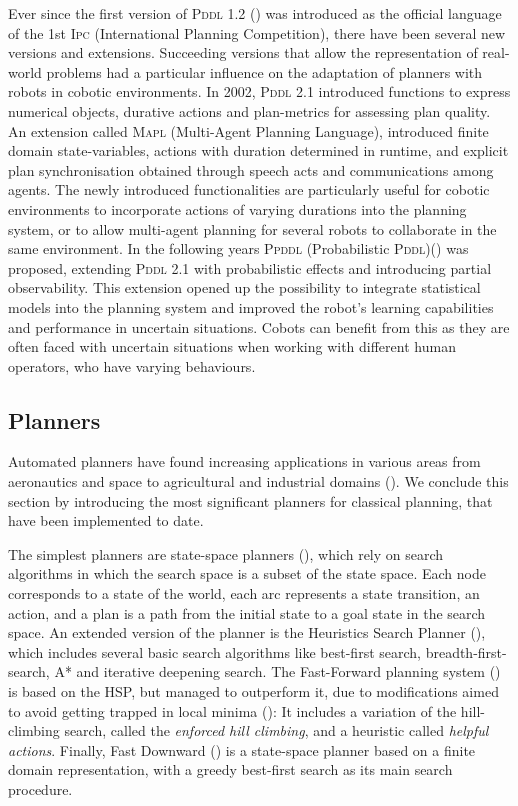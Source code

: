 Ever since the first version of \textsc{Pddl} 1.2 (\cite{mcdermott1998pddl}) was introduced as the official language of the 1st \textsc{Ipc} (International Planning Competition), there have been several new versions and extensions.
Succeeding versions that allow the representation of real-world problems had a particular influence on the adaptation of planners with robots in cobotic environments. In 2002, \textsc{Pddl} 2.1 introduced functions to express numerical objects, durative actions and plan-metrics for assessing plan quality. 
An extension called \textsc{Mapl} (Multi-Agent Planning Language), introduced finite domain state-variables, actions with duration determined in runtime, and explicit plan synchronisation obtained through speech acts and communications among agents. 
The newly introduced functionalities are particularly useful for cobotic environments to incorporate actions of varying durations into the planning system, or to allow multi-agent planning for several robots to collaborate in the same environment.
In the following years \textsc{Ppddl} (Probabilistic \textsc{Pddl})(\cite{younes:04a}) was proposed, extending \textsc{Pddl} 2.1 with probabilistic effects and introducing partial observability. This extension opened up the possibility to integrate statistical models into the planning system and improved the robot's learning capabilities and performance in uncertain situations. Cobots can benefit from this as they are often faced with uncertain situations when working with different human operators, who have varying behaviours.

\subsection{Planners}\label{subsec:Planners}
Automated planners have found increasing applications in various areas from aeronautics and space to agricultural and industrial domains (\cite{aarup1992optimum}). 
We conclude this section by introducing the most significant planners for classical planning, that have been implemented to date. 

The simplest planners are state-space planners (\cite{ghallab2004automated}), which rely on search algorithms in which the search space is a subset of the state space. 
Each node corresponds to a state of the world, each arc represents a state transition, \ie an action, and a plan is a path from the initial state to a goal state in the search space. 
An extended version of the planner is the Heuristics Search Planner (\cite{bonet:01}), which includes several basic search algorithms like best-first search, breadth-first-search, A* and iterative deepening search. 
The Fast-Forward planning system (\cite{hoffmann:11}) is based on the HSP, but managed to outperform it, due to modifications aimed to avoid getting trapped in local minima (\cite{hoffmann2000heuristic}): 
It includes a variation of the hill-climbing search, called the \textit{enforced hill climbing}, and a heuristic called \textit{helpful actions}. 
Finally, Fast Downward (\cite{helmert:06a}) is a state-space planner based on a finite domain representation, with a greedy best-first search as its main search procedure. 

